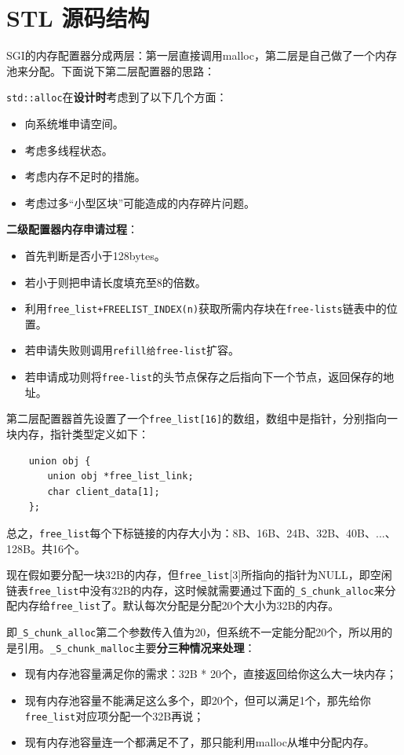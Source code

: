 \documentclass[UTF8,a4paper,12pt]{ctexbook}
\begin{document}
	\section{STL 源码结构}
		SGI的内存配置器分成两层：第一层直接调用malloc，第二层是自己做了一个内存池来分配。下面说下第二层配置器的思路：
		
		\verb|std::alloc|在\textbf{设计时}考虑到了以下几个方面：
			\begin{itemize}
				\item 向系统堆申请空间。
				\item 考虑多线程状态。
				\item 考虑内存不足时的措施。
				\item 考虑过多“小型区块”可能造成的内存碎片问题。
			\end{itemize}
		
		\textbf{二级配置器内存申请过程}：
			\begin{itemize}
				\item 首先判断是否小于128bytes。
				\item 若小于则把申请长度填充至8的倍数。
				\item 利用\verb|free_list+FREELIST_INDEX(n)|获取所需内存块在\verb|free-lists|链表中的位置。
				\item 若申请失败则调用\verb|refill给free-list|扩容。
				\item 若申请成功则将\verb|free-list|的头节点保存之后指向下一个节点，返回保存的地址。
			\end{itemize}
			
		第二层配置器首先设置了一个\verb|free_list[16]|的数组，数组中是指针，分别指向一块内存，指针类型定义如下：
		
		\begin{lstlisting}
	union obj {
	　　union obj *free_list_link;
	　　char client_data[1];
	};
		\end{lstlisting}
		
		总之，\verb|free_list|每个下标链接的内存大小为：8B、16B、24B、32B、40B、...、128B。共16个。
		
		现在假如要分配一块32B的内存，但\verb|free_list|[3]所指向的指针为NULL，即空闲链表\verb|free_list|中没有32B的内存，这时候就需要通过下面的\verb|_S_chunk_alloc|来分配内存给\verb|free_list|了。默认每次分配是分配20个大小为32B的内存。
		
		即\verb|_S_chunk_alloc|第二个参数传入值为20，但系统不一定能分配20个，所以用的是引用。\verb|_S_chunk_malloc|主要\textbf{分三种情况来处理}：
			\begin{itemize}
				\item 现有内存池容量满足你的需求：32B * 20个，直接返回给你这么大一块内存；
				\item 现有内存池容量不能满足这么多个，即20个，但可以满足1个，那先给你\verb|free_list|对应项分配一个32B再说；
				\item 现有内存池容量连一个都满足不了，那只能利用malloc从堆中分配内存。
			\end{itemize}
		
\end{document}
